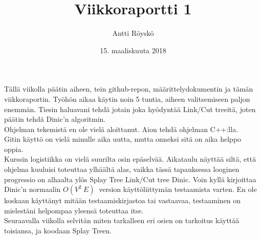 \documentclass{article}
\title{Viikkoraportti 1}
\date{15. maaliskuuta 2018}
\author{Antti R\"oysk\"o}
\begin{document}
\maketitle

\noindent
T\"all\"a viikolla p\"a\"atin aiheen, tein github-repon, m\"a\"arittelydokumentin ja t\"am\"an viikkoraportin. Ty\"oh\"on aikaa k\"aytin noin 5 tuntia, aiheen valitsemiseen paljon enemm\"an. Tiesin haluavani tehd\"a jotain joka hy\"odynt\"a\"a Link/Cut treeit\"a, joten p\"a\"atin tehd\"a Dinic'n algoritmin.\\

\noindent
Ohjelman tekemist\"a en ole viel\"a aloittanut. Aion tehd\"a ohjelman C++:lla.\\

\noindent
Gitin k\"aytt\"o on viel\"a minulle aika uutta, mutta onneksi sit\"a on aika helppo oppia.\\

\noindent
Kurssin logistiikka on viel\"a suurilta osin ep\"aselv\"a\"a. Aikataulu n\"aytt\"a\"a silt\"a, ett\"a ohjelma kuuluisi toteuttaa ylh\"a\"alt\"a alas, vaikka t\"ass\"a tapauksessa looginen progressio on alhaalta yl\"os Splay Tree \rightarrow Link/Cut tree \rightarrow Dinic. Voin kyll\"a kirjoittaa Dinic'n normaalin $O(V^{2}\ E)\ $ version k\"aytt\"oliittym\"an testaamista varten. En ole koskaan k\"aytt\"anyt mit\"a\"an testaamiskirjastoa tai vastaavaa, testaaminen on mielest\"ani helpompaa yleens\"a toteuttaa itse.\\

\noindent
Seuraavalla viikolla selvit\"an miten tarkalleen eri osien on tarkoitus k\"aytt\"a\"a toisiansa, ja koodaan Splay Treen.\\
\end{document}
